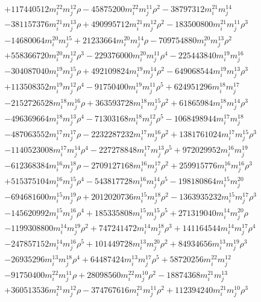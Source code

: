{\begin{align*}
&+117440512m_i^{22}m_j^{12}\rho-45875200m_i^{22}m_j^{11}\rho^{2}-38797312m_i^{21}m_j^{14}\\
&-381157376m_i^{21}m_j^{13}\rho+490995712m_i^{21}m_j^{12}\rho^{2}-183500800m_i^{21}m_j^{11}\rho^{3}\\
&-14680064m_i^{20}m_j^{15}+21233664m_i^{20}m_j^{14}\rho-709754880m_i^{20}m_j^{13}\rho^{2}\\
&+558366720m_i^{20}m_j^{12}\rho^{3}-229376000m_i^{20}m_j^{11}\rho^{4}-225443840m_i^{19}m_j^{16}\\
&-304087040m_i^{19}m_j^{15}\rho+492109824m_i^{19}m_j^{14}\rho^{2}-649068544m_i^{19}m_j^{13}\rho^{3}\\
&+113508352m_i^{19}m_j^{12}\rho^{4}-91750400m_i^{19}m_j^{11}\rho^{5}+624951296m_i^{18}m_j^{17}\\
&-2152726528m_i^{18}m_j^{16}\rho+363593728m_i^{18}m_j^{15}\rho^{2}+61865984m_i^{18}m_j^{14}\rho^{3}\\
&-496369664m_i^{18}m_j^{13}\rho^{4}-71303168m_i^{18}m_j^{12}\rho^{5}-1068498944m_i^{17}m_j^{18}\\
&-487063552m_i^{17}m_j^{17}\rho-2232287232m_i^{17}m_j^{16}\rho^{2}+1381761024m_i^{17}m_j^{15}\rho^{3}\\
&-1140523008m_i^{17}m_j^{14}\rho^{4}-227278848m_i^{17}m_j^{13}\rho^{5}+972029952m_i^{16}m_j^{19}\\
&-612368384m_i^{16}m_j^{18}\rho-2709127168m_i^{16}m_j^{17}\rho^{2}+259915776m_i^{16}m_j^{16}\rho^{3}\\
&+515375104m_i^{16}m_j^{15}\rho^{4}-543817728m_i^{16}m_j^{14}\rho^{5}-198180864m_i^{15}m_j^{20}\\
&-694681600m_i^{15}m_j^{19}\rho+2012020736m_i^{15}m_j^{18}\rho^{2}-1363935232m_i^{15}m_j^{17}\rho^{3}\\
&-145620992m_i^{15}m_j^{16}\rho^{4}+185335808m_i^{15}m_j^{15}\rho^{5}+271319040m_i^{14}m_j^{20}\rho\\
&-1199308800m_i^{14}m_j^{19}\rho^{2}+747241472m_i^{14}m_j^{18}\rho^{3}+141164544m_i^{14}m_j^{17}\rho^{4}\\
&-247857152m_i^{14}m_j^{16}\rho^{5}+101449728m_i^{13}m_j^{20}\rho^{2}+84934656m_i^{13}m_j^{19}\rho^{3}\\
&-26935296m_i^{13}m_j^{18}\rho^{4}+64487424m_i^{13}m_j^{17}\rho^{5}+58720256m_i^{22}m_j^{12}\\
&-91750400m_i^{22}m_j^{11}\rho+28098560m_i^{22}m_j^{10}\rho^{2}-18874368m_i^{21}m_j^{13}\\
&+360513536m_i^{21}m_j^{12}\rho-374767616m_i^{21}m_j^{11}\rho^{2}+112394240m_i^{21}m_j^{10}\rho^{3}\\

\end{align*}}
